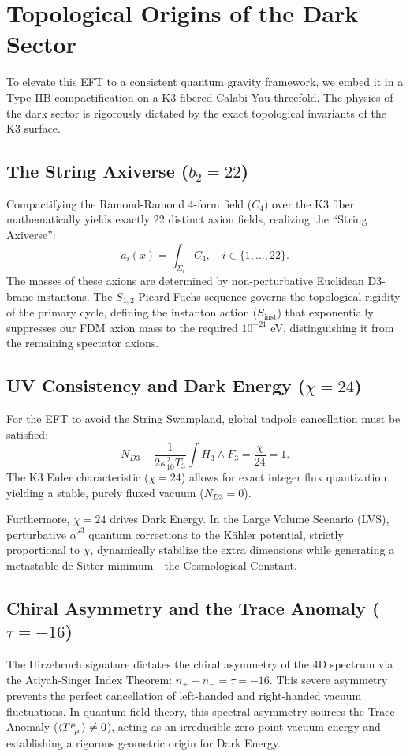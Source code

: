 \documentclass[11pt,a4paper]{article}
\begin{document}
\section{Topological Origins of the Dark Sector}
To elevate this EFT to a consistent quantum gravity framework, we embed it in a Type IIB compactification on a K3-fibered Calabi-Yau threefold. The physics of the dark sector is rigorously dictated by the exact topological invariants of the K3 surface.

\subsection{The String Axiverse ($b_2 = 22$)}
Compactifying the Ramond-Ramond 4-form field ($C_4$) over the K3 fiber mathematically yields exactly 22 distinct axion fields, realizing the ``String Axiverse'':
\begin{equation}
    a_i(x) = \int_{\Sigma_i} C_4, \quad i \in \{1, \dots, 22\}.
\end{equation}
The masses of these axions are determined by non-perturbative Euclidean D3-brane instantons. The $S_{1,2}$ Picard-Fuchs sequence governs the topological rigidity of the primary cycle, defining the instanton action ($S_{\text{inst}}$) that exponentially suppresses our FDM axion mass to the required $10^{-21}$ eV, distinguishing it from the remaining spectator axions.

\subsection{UV Consistency and Dark Energy ($\chi = 24$)}
For the EFT to avoid the String Swampland, global tadpole cancellation must be satisfied:
\begin{equation}
    N_{D3} + \frac{1}{2\kappa_{10}^2 T_3} \int H_3 \wedge F_3 = \frac{\chi}{24} = 1.
\end{equation}
The K3 Euler characteristic ($\chi = 24$) allows for exact integer flux quantization yielding a stable, purely fluxed vacuum ($N_{D3} = 0$).

Furthermore, $\chi=24$ drives Dark Energy. In the Large Volume Scenario (LVS), perturbative $\alpha'^3$ quantum corrections to the Kähler potential, strictly proportional to $\chi$, dynamically stabilize the extra dimensions while generating a metastable de Sitter minimum—the Cosmological Constant.

\subsection{Chiral Asymmetry and the Trace Anomaly ($\tau = -16$)}
The Hirzebruch signature dictates the chiral asymmetry of the 4D spectrum via the Atiyah-Singer Index Theorem: $n_+ - n_- = \tau = -16$. This severe asymmetry prevents the perfect cancellation of left-handed and right-handed vacuum fluctuations. In quantum field theory, this spectral asymmetry sources the Trace Anomaly ($\langle \tensor{T}{^\mu_\mu} \rangle \neq 0$), acting as an irreducible zero-point vacuum energy and establishing a rigorous geometric origin for Dark Energy.
\end{document}
